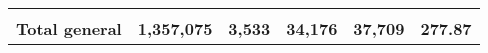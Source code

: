 \begin{tabular}{lrcclr}
	& \multicolumn{1}{l}{}                                           & \multicolumn{1}{l}{}                                       & \multicolumn{1}{l}{} &                                                                     & \multicolumn{1}{l}{}                                                         \\
	\rowcolor[HTML]{DDEBF7} 
	\textbf{Total   general}                                       & \textbf{1,357,075}                                             & \multicolumn{1}{r}{\cellcolor[HTML]{DDEBF7}\textbf{3,533}} & \textbf{34,176}      & \textbf{37,709}                                                     & \textbf{277.87}                                                             
\end{tabular}